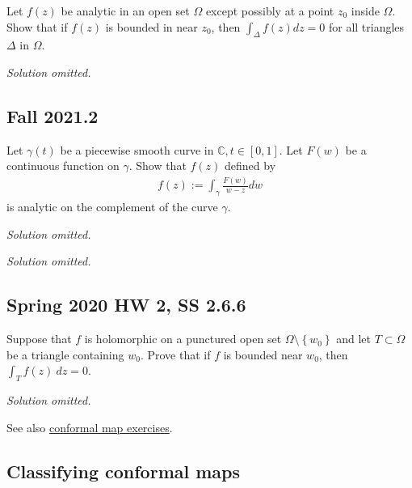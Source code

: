 \begin{problem}[?]

Let \(f(z)\) be analytic in an open set \(\Omega\) except possibly at a
point \(z_0\) inside \(\Omega\). Show that if \(f(z)\) is bounded in
near \(z_0\), then \(\displaystyle \int_\Delta f(z) dz = 0\) for all
triangles \(\Delta\) in \(\Omega\).

\end{problem}

\emph{Solution omitted.}

\hypertarget{fall-2021.2}{%
\subsection{Fall 2021.2}\label{fall-2021.2}}

\begin{problem}[?]

Let \(\gamma(t)\) be a piecewise smooth curve in
\(\mathbb{C}, t \in[0,1]\). Let \(F(w)\) be a continuous function on
\(\gamma\). Show that \(f(z)\) defined by
\begin{align*}
f(z):=\int_{\gamma} \frac{F(w)}{w-z} d w
\end{align*}
is analytic on the complement of the curve \(\gamma\).

\end{problem}

\emph{Solution omitted.}

\emph{Solution omitted.}

\hypertarget{spring-2020-hw-2-ss-2.6.6}{%
\subsection{Spring 2020 HW 2, SS
2.6.6}\label{spring-2020-hw-2-ss-2.6.6}}

\begin{problem}[?]

Suppose that \(f\) is holomorphic on a punctured open set
\(\Omega\setminus\left\{{w_0}\right\}\) and let \(T\subset \Omega\) be a
triangle containing \(w_0\). Prove that if \(f\) is bounded near
\(w_0\), then \(\int_T f(z) ~dz = 0\).

\end{problem}

\emph{Solution omitted.}

See also
\href{30_Complex\%20Analysis/050_Conformal_Maps/035_Conformal_Exercises\%7CConformal\%20map\%20exercises.md}{conformal
map exercises}.

\hypertarget{classifying-conformal-maps}{%
\subsection{Classifying conformal
maps}\label{classifying-conformal-maps}}

